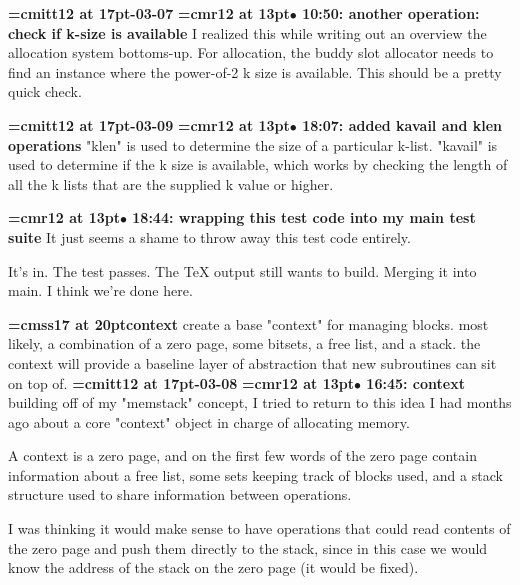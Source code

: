 {\medskip\noindent\bf\font\titlefont=cmitt12 at 17pt-03-07}\medskip
{\smallskip\noindent\bf\font\titlefont=cmr12 at 13pt\titlefont $\bullet$ 10:50: another operation: check if k-size is available}\smallskip
I realized this while writing out an overview the allocation system bottoms-up. For allocation, the buddy slot allocator needs to find an instance where the power-of-2 k size is available. This should be a pretty quick check.
\par

{\medskip\noindent\bf\font\titlefont=cmitt12 at 17pt-03-09}\medskip
{\smallskip\noindent\bf\font\titlefont=cmr12 at 13pt\titlefont $\bullet$ 18:07: added kavail and klen operations}\smallskip
"klen" is used to determine the size of a particular k-list. "kavail" is used to determine if the k size is available, which works by checking the length of all the k lists that are the supplied k value or higher.
\par

{\smallskip\noindent\bf\font\titlefont=cmr12 at 13pt\titlefont $\bullet$ 18:44: wrapping this test code into my main test suite}\smallskip
It just seems a shame to throw away this test code entirely.
\par

It's in. The test passes. The TeX output still wants to build. Merging it into main. I think we're done here.
\par

{\medskip\noindent\bf\font\titlefont=cmss17 at 20pt\titlefont context}\medskip
create a base "context" for managing blocks. most likely,
a combination of a zero page, some bitsets, a free list, and
a stack. the context will provide a baseline layer of abstraction
that new subroutines can sit on top of.
{\medskip\noindent\bf\font\titlefont=cmitt12 at 17pt-03-08}\medskip
{\smallskip\noindent\bf\font\titlefont=cmr12 at 13pt\titlefont $\bullet$ 16:45: context}\smallskip
building off of my "memstack" concept, I tried to return to this idea I had months ago about a core "context" object in charge of allocating memory.
\par

A context is a zero page, and on the first few words of the zero page contain information about a free list, some sets keeping track of blocks used, and a stack structure used to share information between operations.
\par

I was thinking it would make sense to have operations that could read contents of the zero page and push them directly to the stack, since in this case we would know the address of the stack on the zero page (it would be fixed).
\par

